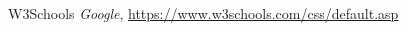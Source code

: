 \begin{thebibliography}{99}
\singlespace \normalsize

    W3Schools
    \textit{Google}, \url{https://www.w3schools.com/css/default.asp} 

\end{thebibliography}

